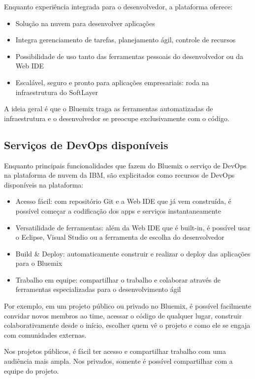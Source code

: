 Enquanto experiência integrada para o desenvolvedor, a plataforma oferece:
\begin{itemize}
    \item Solução na nuvem para desenvolver aplicações
    \item Integra gerenciamento de tarefas, planejamento ágil, controle de recursos
    \item Possibilidade de uso tanto das ferramentas pessoais do desenvolvedor ou da Web IDE
    \item Escalável, seguro e pronto para aplicações empresariais: roda na infraestrutura do SoftLayer
\end{itemize}

A ideia geral é que o Bluemix traga as ferramentas automatizadas de infraestrutura e o desenvolvedor se preocupe exclusivamente com o código.

\subsection{Serviços de DevOps disponíveis}

Enquanto principais funcionalidades que fazem do Bluemix o serviço de DevOps na plataforma de nuvem da IBM, são explicitados como recursos de DevOps disponíveis na plataforma:
\begin{itemize}
    \item Acesso fácil: com repositório Git e a Web IDE que já vem construída, é possível começar a codificação dos apps e serviços instantaneamente
    \item Versatilidade de ferramentas: além da Web IDE que é built-in, é possível usar o Eclipse, Visual Studio ou a ferramenta de escolha do desenvolvedor
    \item Build & Deploy: automaticamente construir e realizar o deploy das aplicações para o Bluemix
    \item Trabalho em equipe: compartilhar o trabalho e colaborar através de ferramentas especializadas para o desenvolvimento ágil
\end{itemize}

Por exemplo, em um projeto público ou privado no Bluemix, é possível facilmente convidar novos membros ao time, acessar o código de qualquer lugar, construir colaborativamente desde o início, escolher quem vê o projeto e como ele se engaja com comunidades externas.

Nos projetos públicos, é fácil ter acesso e compartilhar trabalho com uma audiência mais ampla. Nos privados, somente é possível compartilhar com a equipe do projeto.

